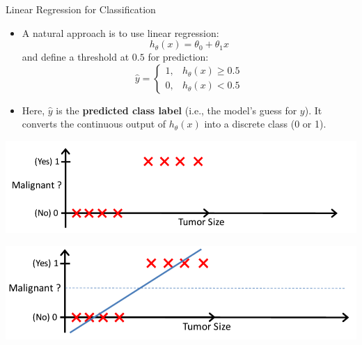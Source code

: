 \documentclass[serif, aspectratio=169]{beamer}
\begin{document}
    \begin{frame}{Linear Regression for Classification}
        \begin{itemize}
            \item A natural approach is to use linear regression:
            \[
                h_\theta(x) = \theta_0 + \theta_1 x
            \]
            and define a threshold at $0.5$ for prediction:
            \[
                \hat{y} =
                \begin{cases}
                    1, & h_\theta(x) \ge 0.5\\
                    0, & h_\theta(x) < 0.5
                \end{cases}
            \]
            \item Here, $\hat{y}$ is the \textbf{predicted class label} (i.e., the model's guess for $y$). It converts the continuous output of $h_\theta(x)$ into a discrete class (0 or 1).
        \end{itemize}

        \vspace{0.5em}
        \begin{minipage}{0.48\linewidth}
            \centering
            \includegraphics[width=\linewidth]{pic/lrClassification1.png}
        \end{minipage}
        \hfill
        \begin{minipage}{0.48\linewidth}
            \centering
            \includegraphics[width=\linewidth]{pic/lrClassification3.png}
        \end{minipage}
    \end{frame}
\end{document}
